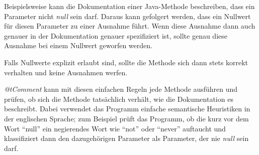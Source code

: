 Beispielsweise kann die Dokumentation einer Java-Methode beschreiben, dass ein Parameter nicht \textit{null} sein darf. Daraus kann gefolgert werden, dass ein Nullwert für diesen Parameter zu einer Ausnahme führt. Wenn diese Ausnahme dann auch genauer in der Dokumentation genauer spezifiziert ist, sollte genau diese Ausnahme bei einem Nullwert geworfen werden. 

Falls Nullwerte explizit erlaubt sind, sollte die Methode sich dann stets korrekt verhalten und keine Ausnahmen werfen. 

\textit{@tComment} kann mit diesen einfachen Regeln jede Methode ausführen und prüfen, ob sich die Methode tatsächlich verhält, wie die Dokumentation es beschreibt. Dabei verwendet das Programm einfache  semantische Heuristiken in der englischen Sprache; zum Beispiel prüft das Programm, ob die kurz vor dem Wort \enquote{null} ein negierendes Wort wie \enquote{not} oder \enquote{never} auftaucht und klassifiziert dann den dazugehörigen Parameter als Parameter, der nie \textit{null} sein darf. 
